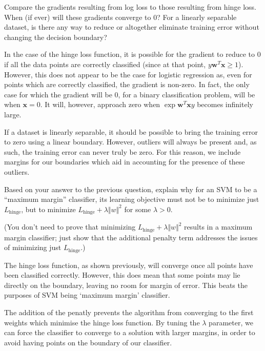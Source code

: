 \problem[4]
Compare the gradients resulting from log loss to those resulting from hinge loss. When (if ever) will these gradients converge to 0? For a linearly separable dataset, is there any way to reduce or altogether eliminate training error without changing the decision boundary?

\begin{solution}
 In the case of the hinge loss function, it is possible for the gradient to reduce to 0 if all the data points are correctly classified (since at that point, $y\mathbf{w}^T\mathbf{x}\geq 1$). However, this does not appear to be the case for logistic regression as, even for points which are correctly classified, the gradient is non-zero. In fact, the only case for which the gradient will be 0, for a binary classification problem, will be when $\mathbf{x}=0$. It will, however, approach zero when $\exp{\mathbf{w}^T\mathbf{x}y}$ becomes infinitely large. 

 If a dataset is linearly separable, it should be possible to bring the training error to zero using a linear boundary. However, outliers will always be present and, as such, the training error can never truly be zero. For this reason, we include margins for our boundaries which aid in accounting for the presence of these outliers.
\end{solution}

\problem[5]
Based on your answer to the previous question, explain why for an SVM to be a ``maximum margin'' classifier, its learning objective must not be to minimize just $L_\text{hinge}$, but to minimize $L_\text{hinge} + \lambda\Vert w \Vert^2$ for some $\lambda > 0$.

(You don't need to prove that minimizing $L_\text{hinge} + \lambda\Vert w \Vert^2$ results in a maximum margin classifier; just show that the additional penalty term addresses the issues of minimizing just $L_\text{hinge}$.)

\begin{solution}
 The hinge loss function, as shown previously, will converge once all points have been classified correctly. However, this does mean that some points may lie directly on the boundary, leaving no room for margin of error. This beats the purposes of SVM being `maximum margin' classifier. 

 The addition of the penatly prevents the algorithm from converging to the first weights which minimise the hinge loss function. By tuning the $\lambda$ parameter, we can force the classifier to converge to a solution with larger margins, in order to avoid having points on the boundary of our classifier.
\end{solution}

